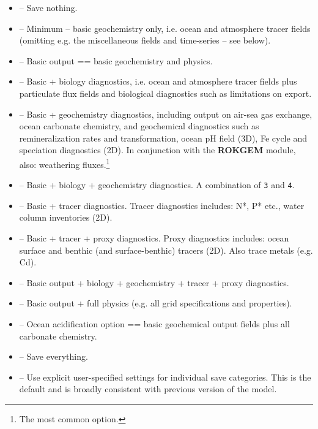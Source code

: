 \documentclass[11pt,fleqn]{book} %
\begin{document}
\vspace{2mm}\begin{itemize}

\item[0] -- Save nothing.
\item[1] -- Minimum -- basic geochemistry only, i.e. ocean and atmosphere tracer fields (omitting e.g. the miscellaneous fields and time-series -- see below).
\item[2] -- Basic output == basic geochemistry and physics.
\item[3] -- Basic + biology diagnostics, i.e. ocean and atmosphere tracer fields plus particulate  flux fields and biological diagnostics such as limitations on export.
\item[4] -- Basic + geochemistry diagnostics, including output on air-sea gas exchange, ocean carbonate chemistry, and geochemical diagnostics such as remineralization rates and transformation, ocean pH field (3D), Fe cycle and speciation diagnostics (2D). In conjunction with the \textbf{ROKGEM} module, also: weathering fluxes.\footnote{The most common option.} \item[5] -- Basic + biology + geochemistry diagnostics. A combination of \texttt{3} and \texttt{4}.
\item[6] -- Basic + tracer diagnostics. Tracer diagnostics includes: N*, P* etc., water column inventories (2D).
\item[7] -- Basic + tracer + proxy diagnostics. Proxy diagnostics includes: ocean surface and benthic (and surface-benthic) tracers (2D). Also trace metals (e.g. Cd).
\item[8] -- Basic output + biology + geochemistry + tracer + proxy diagnostics.
\item[9] -- Basic output + full physics (e.g. all grid specifications and properties).
\item[10] -- Ocean acidification option == basic geochemical output fields plus all carbonate chemistry.
\item[99] -- Save everything.
\item[>99] -- Use explicit user-specified settings for individual save categories. This is the default and is broadly consistent with previous version of the model.

\end{itemize}\vspace{2mm}
\end{document}
